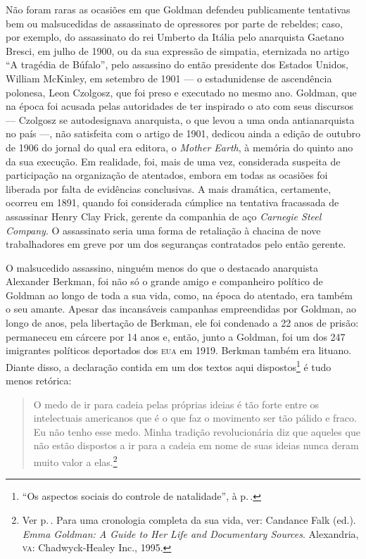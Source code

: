 Não foram raras
as ocasiões em que Goldman defendeu publicamente tentativas bem ou
malsucedidas de assassinato de opressores por parte de rebeldes; caso,
por exemplo, do assassinato do rei Umberto da Itália pelo anarquista
Gaetano Bresci, em julho de 1900, ou da sua expressão de simpatia,
eternizada no artigo ``A tragédia de Búfalo'', pelo assassino do então
presidente dos Estados Unidos, William McKinley, em setembro de 1901 ---
o estadunidense de ascendência polonesa, Leon Czolgosz, que foi preso e
executado no mesmo ano. Goldman, que na época foi acusada pelas
autoridades de ter inspirado o ato com seus discursos --- Czolgosz se
autodesignava anarquista, o que levou a uma onda antianarquista no país
---, não satisfeita com o artigo de 1901, dedicou ainda a edição de
outubro de 1906 do jornal do qual era editora, o \emph{Mother Earth}, à
memória do quinto ano da sua execução. Em realidade, foi, mais de uma
vez, considerada suspeita de participação na organização de atentados,
embora em todas as ocasiões foi liberada por falta de evidências
conclusivas. A mais dramática, certamente, ocorreu em 1891, quando foi
considerada cúmplice na tentativa fracassada de
assassinar Henry Clay Frick, gerente da companhia de aço
\emph{Carnegie Steel Company}. O assassinato seria uma forma de
retaliação à chacina de nove trabalhadores em greve por um dos
seguranças contratados pelo então gerente.

O malsucedido assassino,
ninguém menos do que o destacado anarquista Alexander Berkman, foi não
só o grande amigo e companheiro político de Goldman ao longo de toda a
sua vida, como, na época do atentado, era também o seu amante. Apesar
das incansáveis campanhas empreendidas por Goldman, ao longo de anos,
pela libertação de Berkman, ele foi condenado a 22 anos de
prisão: permaneceu em cárcere por 14 anos e, então,
junto a Goldman, foi um dos 247 imigrantes políticos deportados
dos \textsc{eua} em 1919. Berkman também era lituano. Diante disso, a declaração
contida em um dos textos aqui dispostos\footnote{``Os aspectos sociais do
controle de natalidade'', à p.\,\pageref{ref4}.} é tudo menos retórica:

\begin{quote}
O medo de ir para
cadeia pelas próprias ideias é tão forte entre os intelectuais
americanos que é o que faz o movimento ser tão pálido e fraco. Eu não
tenho esse medo. Minha tradição revolucionária diz que aqueles que não
estão dispostos a ir para a cadeia em nome de suas ideias nunca deram
muito valor a elas.\footnote{Ver p.\,\pageref{ref5}. Para uma cronologia completa da sua vida, ver: Candance Falk (ed.). \emph{Emma Goldman: A Guide to
  Her Life and Documentary Sources}. Alexandria, \textsc{va}: Chadwyck-Healey
  Inc., 1995.}
\end{quote}

